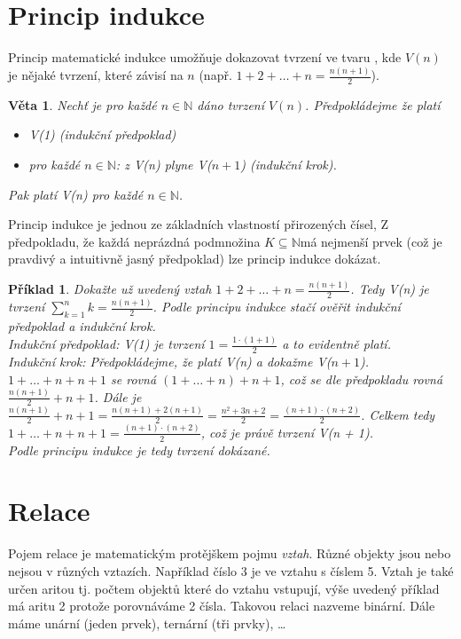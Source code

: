 \documentclass[12pt,a4paper]{article}
\newtheorem{sentence}{Věta}
\newtheorem{example}{Příklad}
\begin{document}
\section{Princip indukce}
Princip matematické indukce umožňuje dokazovat tvrzení ve tvaru , kde $V(n)$ je nějaké tvrzení, které závisí na $n$ (např. $1 + 2 + \dots + n = \frac{n(n+1)}{2}$).

\begin{sentence}
	Nechť je pro každé $n \in \mathbb{N}$ dáno tvrzení $V(n)$. Předpokládejme že platí
	\begin{itemize}
		\item V(1) (indukční předpoklad)
		\item pro každé $n \in \mathbb{N}$: z V(n) plyne V($n+1$) (indukční krok).
	\end{itemize}
	Pak platí V(n) pro každé $n \in \mathbb{N}$.
\end{sentence}

Princip indukce je jednou ze základních vlastností přirozených čísel, Z předpokladu, že každá neprázdná podmnožina $K \subseteq \mathbb{N}$má nejmenší prvek (což je pravdivý a intuitivně jasný předpoklad) lze princip indukce dokázat.

\begin{example}
	Dokažte už uvedený vztah $1 + 2 + \dots + n = \frac{n(n+1)}{2}$. Tedy V(n) je tvrzení $\sum^n_{k=1} k =  \frac{n(n+1)}{2}$. Podle principu indukce stačí ověřit indukční předpoklad a indukční krok. \\[6pt]
	Indukční předpoklad: V(1) je tvrzení $1 = \frac{1 \cdot (1 + 1)}{2}$ a to evidentně platí.\\[6pt]
	Indukční krok: Předpokládejme, že platí V(n) a dokažme V($n + 1$). $1 + \dots + n + n + 1$ se rovná  $(1 + \dots + n) + n + 1$, což se dle předpokladu rovná $\frac{n(n + 1)}{2} + n + 1$. Dále je $\frac{n(n + 1)}{2} + n + 1 = \frac{n(n + 1) + 2(n + 1)}{2} = \frac{n^2 + 3n + 2}{2} = \frac{(n + 1) \cdot (n + 2)}{2}$. Celkem tedy $1 + \dots + n + n + 1 =  \frac{(n + 1) \cdot (n + 2)}{2}$, což je právě tvrzení V(n + 1).\\[6pt]
	Podle principu indukce je tedy tvrzení dokázané.
\end{example}

\section{Relace}
Pojem relace je matematickým protějškem pojmu \textit{vztah}. Různé objekty jsou nebo nejsou v různých vztazích. Například číslo 3 je ve vztahu  s číslem 5. Vztah je také určen aritou tj. počtem objektů které do vztahu vstupují, výše uvedený příklad má aritu 2 protože porovnáváme 2 čísla. Takovou relaci nazveme binární. Dále máme unární (jeden prvek), ternární (tři prvky), \dots
\end{document}
